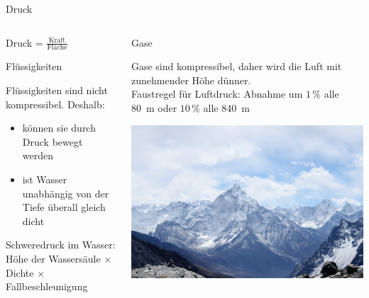 \documentclass{beamer}
\begin{document}

\begin{frame}{Druck}


\begin{columns}[c]



\begin{column}{5cm}

Druck = \(\frac{\text{Kraft}}{\text{Fläche}}\)


\begin{block}{Flüssigkeiten}

Flüssigkeiten sind nicht kompressibel. Deshalb: 
\begin{itemize}
    \item 
    können sie durch Druck bewegt werden
    \item
    ist Wasser unabhängig von der Tiefe überall gleich dicht
\end{itemize}

Schweredruck im Wasser: Höhe der Wassersäule \(\times\) Dichte \(\times\) Fallbeschleunigung 
\end{block}

\end{column}
\pause
\begin{column}{5cm}
\begin{block}{Gase}

Gase sind kompressibel, daher wird die Luft mit zunehmender Höhe dünner. \\

Faustregel für Luftdruck: Abnahme um \(1\,\%\) alle \SI{80}{\meter} oder \(10\,\%\) alle \SI{840}{\meter} \\[0.5 cm]

\end{block}

\begin{center}
\includegraphics[width=\textwidth]{berge.jpg}    
\end{center}


\end{column}



\end{columns}

    
    
\end{frame}
\end{document}
